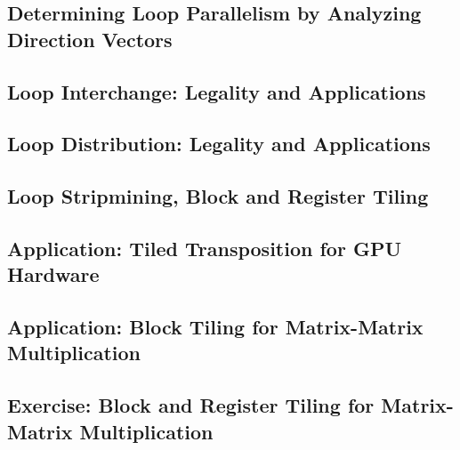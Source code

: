 \documentclass[acmsmall,review]{acmart}\settopmatter{printfolios=true,printccs=false,printacmref=false}
\begin{document}
\subsection{Determining Loop Parallelism by Analyzing Direction Vectors}
\label{subsec:loop-par}

\subsection{Loop Interchange: Legality and Applications}
\label{subsec:loop-interch}

\subsection{Loop Distribution: Legality and Applications}
\label{subsec:loop-distrib}

\subsection{Loop Stripmining, Block and Register Tiling}
\label{subsec:strip-tiling}

\subsection{Application: Tiled Transposition for GPU Hardware}
\label{subsec:transp}

\subsection{Application: Block Tiling for Matrix-Matrix Multiplication}
\label{subsec:block-mmm}

\subsection{Exercise: Block and Register Tiling for Matrix-Matrix Multiplication}
\label{subsec:block-reg-tiled-mmm}

\newpage

\end{document}
